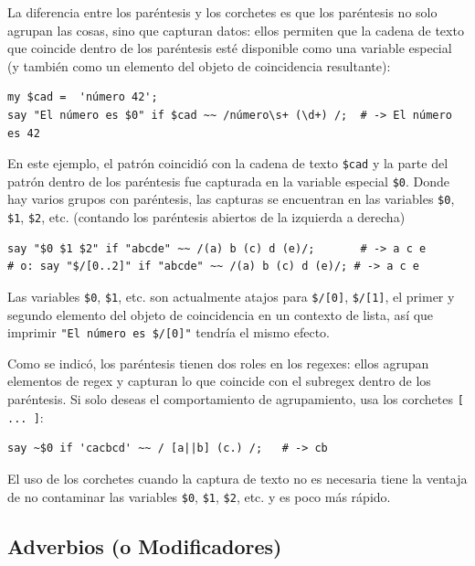 La diferencia entre los paréntesis y los corchetes es que los
paréntesis no solo agrupan las cosas, sino que capturan datos:
ellos permiten que la cadena de texto que
coincide dentro de los paréntesis esté disponible como una 
variable especial (y también como un elemento del objeto
de coincidencia resultante): 


\begin{verbatim}
my $cad =  'número 42';
say "El número es $0" if $cad ~~ /número\s+ (\d+) /;  # -> El número es 42
\end{verbatim}
%

En este ejemplo, el patrón coincidió con la cadena de 
texto \verb|$cad| y la parte del patrón dentro de los 
paréntesis fue capturada en la variable especial \verb|$0|.
Donde hay varios grupos con paréntesis, las capturas se
encuentran en las variables \verb|$0|, \verb|$1|, \verb|$2|, etc.
(contando los paréntesis abiertos de la izquierda a derecha)

\begin{verbatim}
say "$0 $1 $2" if "abcde" ~~ /(a) b (c) d (e)/;       # -> a c e
# o: say "$/[0..2]" if "abcde" ~~ /(a) b (c) d (e)/; # -> a c e
\end{verbatim}
%

Las variables \verb|$0|, \verb|$1|, etc. son actualmente atajos
para \verb|$/[0]|, \verb|$/[1]|, el primer y segundo elemento del
objeto de coincidencia en un contexto de lista, así que imprimir
\verb|"El número es $/[0]"| tendría el mismo efecto.

Como se indicó, los paréntesis tienen dos roles en los regexes:
ellos agrupan elementos de regex y capturan lo que coincide 
con el subregex dentro de los paréntesis. Si solo deseas el 
comportamiento de agrupamiento, usa los corchetes
\verb|[ ... ]|:

\begin{verbatim}
say ~$0 if 'cacbcd' ~~ / [a||b] (c.) /;   # -> cb
\end{verbatim}
%

El uso de los corchetes cuando la captura de texto no
es necesaria tiene la ventaja de no contaminar las
variables \verb|$0|, \verb|$1|, \verb|$2|, etc. y es 
poco más rápido.

\subsection{Adverbios (o  Modificadores)}
\label{adverb}

